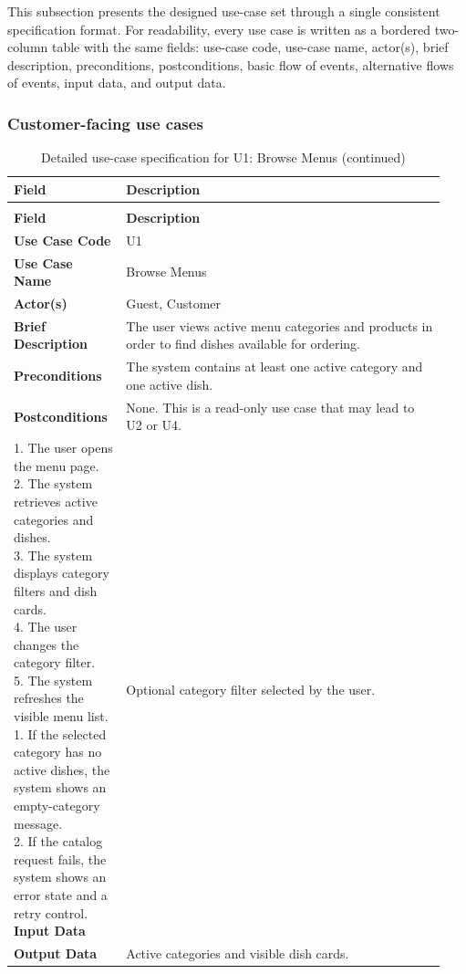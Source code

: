 This subsection presents the designed use-case set through a single consistent specification format. For readability, every use case is written as a bordered two-column table with the same fields: use-case code, use-case name, actor(s), brief description, preconditions, postconditions, basic flow of events, alternative flows of events, input data, and output data.

\setlength{\LTleft}{0pt}
\setlength{\LTright}{0pt}
\renewcommand{\arraystretch}{1.08}

\newcommand{\ucfield}[2]{\textbf{#1} & #2 \\ \hline}

\subsubsection*{Customer-facing use cases}

\begingroup
\footnotesize
\begin{longtable}{|>{\raggedright\arraybackslash}p{0.24\linewidth}|>{\raggedright\arraybackslash}p{0.70\linewidth}|}
\caption{Detailed use-case specification for U1: Browse Menus}\label{tab:uc-u1}\\ \hline
\textbf{Field} & \textbf{Description} \\ \hline
\endfirsthead
\caption[]{Detailed use-case specification for U1: Browse Menus (continued)}\\ \hline
\textbf{Field} & \textbf{Description} \\ \hline
\endhead
\ucfield{Use Case Code}{U1}
\ucfield{Use Case Name}{Browse Menus}
\ucfield{Actor(s)}{Guest, Customer}
\ucfield{Brief Description}{The user views active menu categories and products in order to find dishes available for ordering.}
\ucfield{Preconditions}{The system contains at least one active category and one active dish.}
\ucfield{Postconditions}{None. This is a read-only use case that may lead to U2 or U4.}
\ucfield{Basic Flow of Events}{1. The user opens the menu page. \newline 2. The system retrieves active categories and dishes. \newline 3. The system displays category filters and dish cards. \newline 4. The user changes the category filter. \newline 5. The system refreshes the visible menu list.}
\ucfield{Alternative Flows of Events}{1. If the selected category has no active dishes, the system shows an empty-category message. \newline 2. If the catalog request fails, the system shows an error state and a retry control.}
\ucfield{Input Data}{Optional category filter selected by the user.}
\ucfield{Output Data}{Active categories and visible dish cards.}
\end{longtable}
\endgroup


